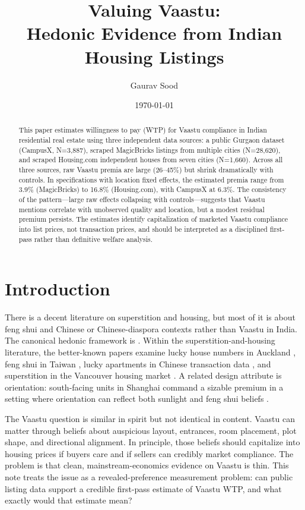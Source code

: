 \documentclass[11pt]{article}
\title{Valuing Vaastu:\\Hedonic Evidence from Indian Housing Listings}
\author{Gaurav Sood}
\date{\today}
\begin{document}
\maketitle

\begin{abstract}
This paper estimates willingness to pay (WTP) for Vaastu compliance in Indian residential real estate using three independent data sources: a public Gurgaon dataset (CampusX, N=3,887), scraped MagicBricks listings from multiple cities (N=28,620), and scraped Housing.com independent houses from seven cities (N=1,660). Across all three sources, raw Vaastu premia are large (26--45\%) but shrink dramatically with controls. In specifications with location fixed effects, the estimated premia range from 3.9\% (MagicBricks) to 16.8\% (Housing.com), with CampusX at 6.3\%. The consistency of the pattern---large raw effects collapsing with controls---suggests that Vaastu mentions correlate with unobserved quality and location, but a modest residual premium persists. The estimates identify capitalization of marketed Vaastu compliance into list prices, not transaction prices, and should be interpreted as a disciplined first-pass rather than definitive welfare analysis.
\end{abstract}

\section{Introduction}

There is a decent literature on superstition and housing, but most of it is about feng shui and Chinese or Chinese-diaspora contexts rather than Vaastu in India. The canonical hedonic framework is \citet{rosen1974}. Within the superstition-and-housing literature, the better-known papers examine lucky house numbers in Auckland \citep{bourassa_peng1999}, feng shui in Taiwan \citep{lin_chen_twu2012}, lucky apartments in Chinese transaction data \citep{shum_sun_ye2014}, and superstition in the Vancouver housing market \citep{fortin_hill_huang2014}. A related design attribute is orientation: south-facing units in Shanghai command a sizable premium in a setting where orientation can reflect both sunlight and feng shui beliefs \citep{lu2018}.

The Vaastu question is similar in spirit but not identical in content. Vaastu can matter through beliefs about auspicious layout, entrances, room placement, plot shape, and directional alignment. In principle, those beliefs should capitalize into housing prices if buyers care and if sellers can credibly market compliance. The problem is that clean, mainstream-economics evidence on Vaastu is thin. This note treats the issue as a revealed-preference measurement problem: can public listing data support a credible first-pass estimate of Vaastu WTP, and what exactly would that estimate mean?
\end{document}
